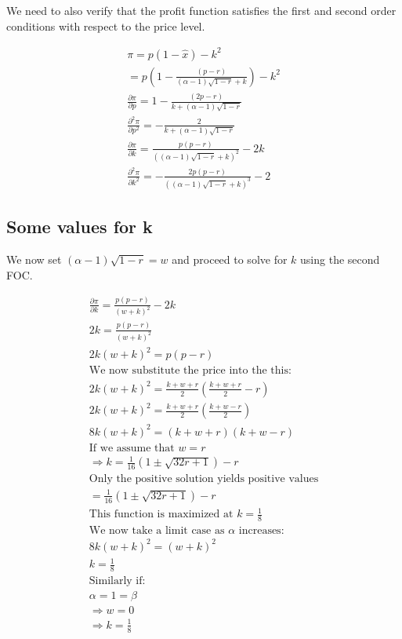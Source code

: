 We need to also verify that the profit function satisfies the first and second order conditions with respect to the price level.

\begin{align*}
\pi = p\left(1-\hat{x}\right) - k^2 \\
=p\left(1-\frac{ (p-r)}{(\alpha-1)
\sqrt{ 1-r }
+k} \right) -k^2
\\
\frac{\partial \pi }{\partial p} = 1-\frac{ (2p-r)}{
k+ (\alpha-1)\sqrt{ 1 -r }} \\
\frac{\partial^2 \pi }{\partial p^2}
= -\frac{ 2}{
k+ (\alpha-1)\sqrt{ 1 -r }} \\
\frac{\partial \pi}{\partial k} = \frac{ p(p-r)}{((\alpha-1)
\sqrt{ 1-r }
+k)^2} -2k
\\
\frac{\partial^2 \pi}{\partial k^2} = -\frac{2 p(p-r)}{((\alpha-1)
\sqrt{ 1-r }
+k)^3} -2 
\end{align*}

\subsection{Some values for k}

We now set $ (\alpha-1)\sqrt{ 1 -r }=w$ and proceed to solve for $k$ using the second FOC.  

\begin{align*}
\frac{\partial \pi}{\partial k} = \frac{ p(p-r)}{(w
+k)^2} -2k \\
2k= \frac{ p(p-r)}{(w
+k)^2} \\
2k(w+k)^2=p(p-r) \\
\text{We now substitute the price into the this: } \\
2k(w+k)^2=\frac{k+ w+r}{2} \left(\frac{k+ w+r}{2}-r \right) \\
2k(w+k)^2=\frac{k+ w+r}{2} \left(\frac{k+ w-r}{2} \right) \\
8k(w+k)^2= \left( k+ w+r \right) \left(k+ w-r\right) \\
\text{If we assume that $w=r$} \\
\Rightarrow 
k = \frac{1}{16} \left(1\pm \sqrt{32 r+1}\right) - r\\
\text{Only the positive solution yields positive values} \\
= \frac{1}{16} \left(1\pm \sqrt{32 r+1}\right) - r \\
\text{This function is maximized at $k=\frac{1}{8}$} \\
\text{We now take a limit case as $\alpha$ increases:} \\
8k(w+k)^2= \left( w+ k \right)^2 \\
k = \frac{1}{8} \\
\text{Similarly if:} \\
\alpha=1=\beta \\
\Rightarrow w = 0 \\
\Rightarrow k = \frac{1}{8} 
\end{align*}

